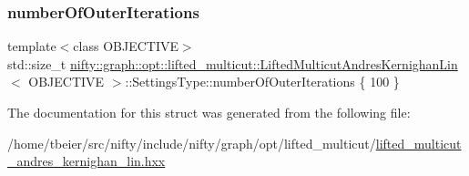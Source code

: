 \subsubsection{\texorpdfstring{number\+Of\+Outer\+Iterations}{numberOfOuterIterations}}
{\footnotesize\ttfamily template$<$class O\+B\+J\+E\+C\+T\+I\+VE$>$ \\
std\+::size\+\_\+t \hyperlink{classnifty_1_1graph_1_1opt_1_1lifted__multicut_1_1LiftedMulticutAndresKernighanLin}{nifty\+::graph\+::opt\+::lifted\+\_\+multicut\+::\+Lifted\+Multicut\+Andres\+Kernighan\+Lin}$<$ O\+B\+J\+E\+C\+T\+I\+VE $>$\+::Settings\+Type\+::number\+Of\+Outer\+Iterations \{ 100 \}}



The documentation for this struct was generated from the following file\+:\begin{DoxyCompactItemize}
\item 
/home/tbeier/src/nifty/include/nifty/graph/opt/lifted\+\_\+multicut/\hyperlink{lifted__multicut__andres__kernighan__lin_8hxx}{lifted\+\_\+multicut\+\_\+andres\+\_\+kernighan\+\_\+lin.\+hxx}\end{DoxyCompactItemize}
